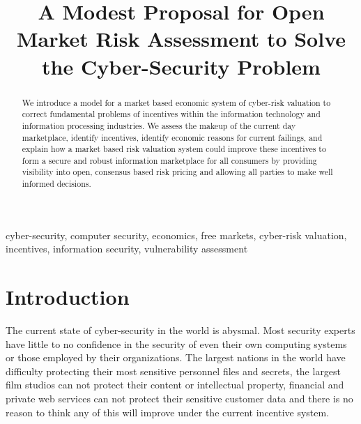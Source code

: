 \documentclass[conference]{IEEEtran}
\begin{document}
\title{A Modest Proposal for Open Market Risk Assessment to Solve the Cyber-Security Problem}

\author{
\and
{}
\and
{}
}

\maketitle

\begin{abstract}
We introduce a model for a market based economic system of cyber-risk valuation to correct fundamental problems of incentives within the information technology and information processing industries.  We assess the makeup of the current day marketplace, identify incentives, identify economic reasons for current failings, and explain how a market based risk valuation system could improve these incentives to form a secure and robust information marketplace for all consumers by providing visibility into open, consensus based risk pricing and allowing all parties to make well informed decisions.
\end{abstract}

\begin{IEEEkeywords}
cyber-security, computer security, economics, free markets, cyber-risk valuation, incentives, information security, vulnerability assessment
\end{IEEEkeywords}

\IEEEpeerreviewmaketitle

\section{Introduction}
The current state of cyber-security in the world is abysmal.  Most security experts have little to no confidence in the security of even their own computing systems or those employed by their organizations.  The largest nations in the world have difficulty protecting their most sensitive personnel files and secrets, the largest film studios can not protect their content or intellectual property, financial and private web services can not protect their sensitive customer data and there is no reason to think any of this will improve under the current incentive system.   
\end{document}
